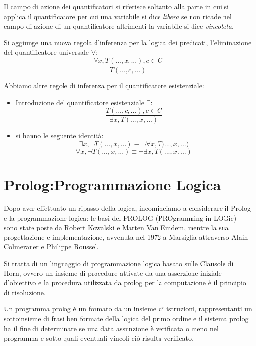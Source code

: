 \documentclass[a4paper]{report}
\begin{document}
Il campo di azione dei quantificatori si riferisce soltanto alla parte in cui
si applica il quantificatore per cui una variabile si dice \emph{libera}
se non ricade nel campo di azione di un quantificatore altrimenti la variabile si dice \emph{vincolata}.

Si aggiunge una nuova regola d'inferenza per la logica dei predicati, l'eliminazione del quantificatore universale $\forall$:
$$\frac{\forall x, T(...,x,...), c\in C}{T(...,c,...)}$$

Abbiamo altre regole di inferenza per il quantificatore esistenziale:
\begin{itemize}
\item Introduzione del quantificatore esistenziale $\exists$:
$$\frac{T(...,c,...), c\in C}{\exists x, T(...,x,...)}$$
\item si hanno le seguente identità:
$$\exists x, \neg T(...,x,...)\equiv \neg\forall x, T)...,x,...)$$
$$\forall x, \neg T(...,x,...)\equiv \neg\exists x, T(...,x,...)$$
\end{itemize}

\chapter{Prolog:Programmazione Logica}
Dopo aver effettuato un ripasso della logica, incominciamo a considerare il Prolog e la programmazione logica:
le basi del PROLOG (PROgramming in LOGic) sono state poste da Robert Kowalski e Marten Van Emdem, mentre la sua progettazione e implementazione,
avvenuta nel 1972 a Marsiglia attraverso Alain Colmerauer e Philippe Roussel.

Si tratta di un linguaggio di programmazione logica basato sulle Clausole di Horn, ovvero un insieme di procedure attivate
da una asserzione iniziale d’obiettivo e la procedura utilizzata da prolog per la computazione è il principio di risoluzione.

Un programma prolog è un formato da un insieme di istruzioni, rappresentanti un sottoinsieme di frasi ben formate della logica del primo ordine
e il sistema prolog ha il fine di determinare se una data assunzione è verificata o meno nel programma e sotto quali eventuali vincoli
ciò risulta  verificato.
\end{document}
